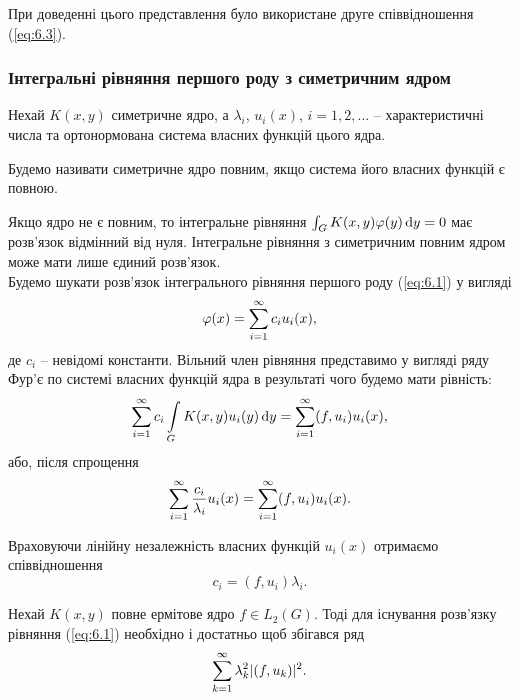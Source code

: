 При доведенні цього представлення було використане друге співвідношення (\ref{eq:6.3}).

\subsubsection{Інтегральні рівняння першого роду з симетричним ядром}

Нехай $K(x, y)$ симетричне ядро, а $\lambda_i$, $u_i(x)$, $i=1,2,\ldots$ -- характеристичні числа та ортонормована система власних функцій цього ядра.

\begin{definition}
	Будемо називати симетричне ядро повним, якщо система його власних функцій є повною.
\end{definition}

Якщо ядро не є повним, то інтегральне рівняння $\int_G K(x,y)\varphi(y)\mathop{}\!\mathrm{d} y=0$ має розв’язок відмінний від нуля. Інтегральне рівняння з симетричним повним ядром може мати лише єдиний розв’язок. \\

Будемо шукати розв’язок інтегрального рівняння першого роду (\ref{eq:6.1}) у вигляді
\begin{equation}
	\label{eq:6.6}
	\varphi(x) = \displaystyle\sum\limits_{i=1}^\infty c_i u_i(x),
\end{equation}
де $c_i$ -- невідомі константи. Вільний член рівняння представимо у вигляді ряду Фур’є по системі власних функцій ядра в результаті чого будемо мати рівність:
\begin{equation}
	\label{eq:6.7}
	\displaystyle\sum\limits_{i=1}^\infty c_i \displaystyle\int\limits_G K(x,y) u_i(y) \mathop{}\!\mathrm{d} y = \displaystyle\sum\limits_{i=1}^\infty (f,u_i)u_i(x),
\end{equation}
або, після спрощення  \[ \displaystyle\sum\limits_{i=1}^\infty \dfrac{c_i}{\lambda_i} u_i(x) = \displaystyle\sum\limits_{i=1}^\infty (f,u_i)u_i(x). \]

Враховуючи лінійну незалежність власних функцій $u_i(x)$ отримаємо співвідношення 
\begin{equation}
	\label{eq:6.8}
	c_i = (f, u_i) \lambda_i.
\end{equation}

\begin{theorem} 
	Нехай $K(x, y)$ повне ермітове ядро $f \in L_2(G)$. Тоді для існування розв’язку рівняння (\ref{eq:6.1}) необхідно і достатньо щоб збігався ряд
	\begin{equation}
		\label{eq:6.9}
		\displaystyle\sum\limits_{k=1}^\infty \lambda_k^2 |(f, u_k)|^2.
	\end{equation}
\end{theorem}

